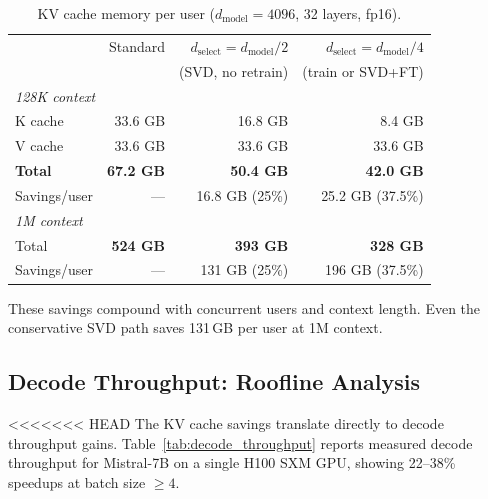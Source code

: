 \documentclass[11pt]{article}
\newcommand{\dmodel}{d_{\text{model}}}
\newcommand{\dselect}{d_{\text{select}}}
\begin{document}
\begin{table}[h]
\centering
\caption{KV cache memory per user ($\dmodel = 4096$, 32 layers, fp16).}
\label{tab:kvcache}
\begin{tabular}{lrrr}
\toprule
 & Standard & $\dselect = \dmodel/2$ & $\dselect = \dmodel/4$ \\
 & & (SVD, no retrain) & (train or SVD+FT) \\
\midrule
\multicolumn{4}{l}{\emph{128K context}} \\
\quad K cache & 33.6 GB & 16.8 GB & 8.4 GB \\
\quad V cache & 33.6 GB & 33.6 GB & 33.6 GB \\
\quad \textbf{Total} & \textbf{67.2 GB} & \textbf{50.4 GB} & \textbf{42.0 GB} \\
\quad Savings/user & --- & 16.8 GB (25\%) & 25.2 GB (37.5\%) \\
\midrule
\multicolumn{4}{l}{\emph{1M context}} \\
\quad Total & \textbf{524 GB} & \textbf{393 GB} & \textbf{328 GB} \\
\quad Savings/user & --- & 131 GB (25\%) & 196 GB (37.5\%) \\
\bottomrule
\end{tabular}
\end{table}

These savings compound with concurrent users and context length. Even the conservative SVD path saves 131\,GB per user at 1M context.


\subsection{Decode Throughput: Roofline Analysis}\label{sec:decode_throughput}

<<<<<<< HEAD
The KV cache savings translate directly to decode throughput gains. Table~\ref{tab:decode_throughput} reports measured decode throughput for Mistral-7B on a single H100 SXM GPU, showing 22--38\% speedups at batch size $\geq 4$.
\end{document}
